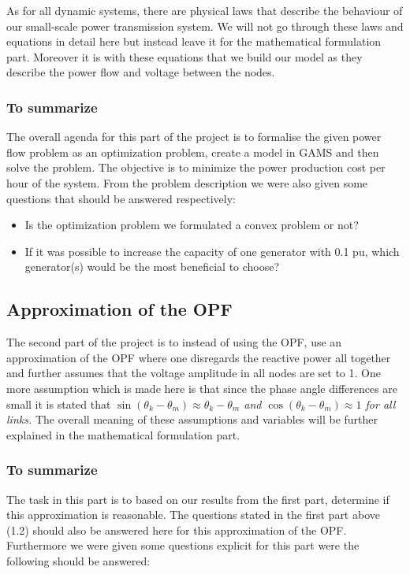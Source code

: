 As for all dynamic systems, there are physical laws that describe the behaviour of our small-scale power transmission system. We will not go through these laws and equations in detail here but instead leave it for the mathematical formulation part. Moreover it is with these equations that we build our model as they describe the power flow and voltage between the nodes.

\subsubsection*{To summarize}
The overall agenda for this part of the project is to formalise the given power flow problem as an optimization problem, create a model in GAMS and then solve the problem. The objective is to minimize the power production cost per hour of the system. From the problem description we were also given some questions that should be answered respectively:

\begin{itemize}
    \item Is the optimization problem we formulated a convex problem or not?
    \item If it was possible to increase the capacity of one generator with 0.1 pu, which generator(s)
    would be the most beneficial to choose?
\end{itemize}

\subsection{Approximation of the OPF}

The second part of the project is to instead of using the OPF, use an approximation of the OPF where one disregards the reactive power all together and further assumes that the voltage amplitude in all nodes are set to 1. One more assumption which is made here is that since the phase angle differences are small it is stated that \textit{$\sin{(\theta_k - \theta_m)} \approx \theta_k - \theta_m$ and $\cos{(\theta_k - \theta_m)} \approx 1$ for all links.} The overall meaning of these assumptions and variables will be further explained in the mathematical formulation part.

\subsubsection*{To summarize}
The task in this part is to based on our results from the first part, determine if this approximation is reasonable. The questions stated in the first part above (1.2) should also be answered here for this approximation of the OPF. Furthermore we were given some questions explicit for this part were the following should be answered:

